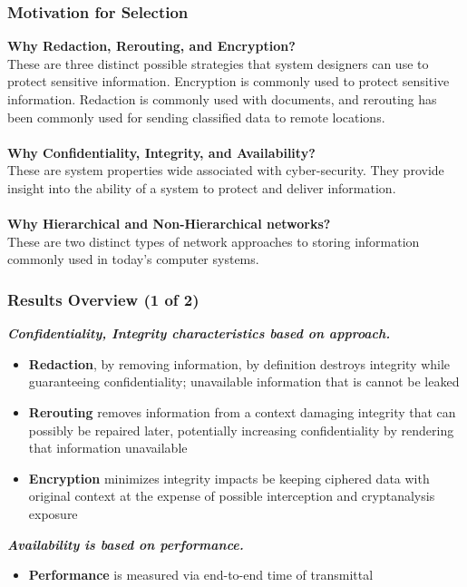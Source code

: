\documentclass[t,handout]{beamer}
\begin{document}
\begin{frame}
\frametitle{Motivation for Selection}
{\bf Why Redaction, Rerouting, and Encryption?} \\
{\small These are three distinct possible strategies that system designers can use to protect sensitive information.  Encryption is commonly used to protect sensitive information.  Redaction is commonly used with documents, and rerouting has been commonly used for sending classified data to remote locations.} \\
~\\
{\bf Why Confidentiality, Integrity, and Availability?} \\
{\small These are system properties wide associated with cyber-security.  They provide insight into the ability of a system to protect and deliver information.} \\
~\\
{\bf Why Hierarchical and Non-Hierarchical networks?} \\
{\small These are two distinct types of network approaches to storing information commonly used in today's computer systems.}
\end{frame}

\begin{frame}
\frametitle{Results Overview (1 of 2)}
{\bf \textit{Confidentiality, Integrity characteristics based on approach.}} \\
\begin{itemize}
\item {\small {\bf Redaction}, by removing information, by definition destroys integrity while guaranteeing confidentiality; unavailable information that is cannot be leaked}
\item {\small {\bf Rerouting} removes information from a context damaging integrity that can possibly be repaired later, potentially increasing confidentiality by rendering that information unavailable}
\item {\small {\bf Encryption} minimizes integrity impacts be keeping ciphered data with original context at the expense of possible interception and cryptanalysis exposure}
\end{itemize}
{\bf \textit{Availability is based on performance.}} \\
\begin{itemize}
\item {\small {\bf Performance} is measured via end-to-end time of transmittal}
\end{itemize}
\end{frame}
\end{document}
